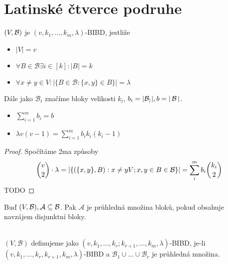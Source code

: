 \section{\texorpdfstring{Latinské čtverce podruhe}{Latinské čtverce podruhe}}

\begin{definition}
    $(V,\operatorname{\mathcal{B}})$ je $(v,k_1,\ldots,k_m,\lambda)$-BIBD, jestliže
    \begin{itemize}
        \item $|V| = v$
        \item $\forall B\in\mathcal{B}\exists i \in[k]: |B|=k$
        \item $\forall x\neq y\in V: |\{B\in\mathcal{B}: \{x,y\}\in B\}|=\lambda$
    \end{itemize}

    Dále jako $\mathcal{B}_i$ značíme bloky velikosti $k_i$, $b_i=|\mathcal{B_i}|, b=|\operatorname{\mathcal{B}}|$.
\end{definition}
\begin{note}
    \begin{itemize}
        \item $\sum_{i=1}^mb_i=b$
        \item $\lambda v(v-1)=\sum_{i=1}^m b_ik_i(k_i-1)$
    \end{itemize}
\end{note}
\begin{proof}
	Spočítáme 2ma způsoby
	\[ \binom{v}{2} \cdot \lambda = |\{ (\{ x, y \}, B): x \ne y V; x, y \in B \in \operatorname{\mathcal{B}} \}| = \sum_i^m b_i \binom{k_i}{2} \]
    TODO
\end{proof}

\begin{definition}
    Buď $(V,\operatorname{\mathcal{B}}), \mathcal{A} \subseteq \operatorname{\mathcal{B}}$.
    Pak $\mathcal{A}$ je průhledná množina bloků, pokud obsahuje navzájem disjunktní bloky.
\end{definition}
\begin{definition}~\\
    $(V,\mathcal{B})$ definujeme jako $(v,k_1,\ldots,k_r;k_{r+1}, \ldots, k_m,\lambda)$-BIBD, je-li $(v,k_1,\ldots,k_r,k_{r+1},k_m,\lambda)$-BIBD a $\mathcal{B}_1\cup\ldots\cup\mathcal{B}_r$ je průhledná množina.
\end{definition}

